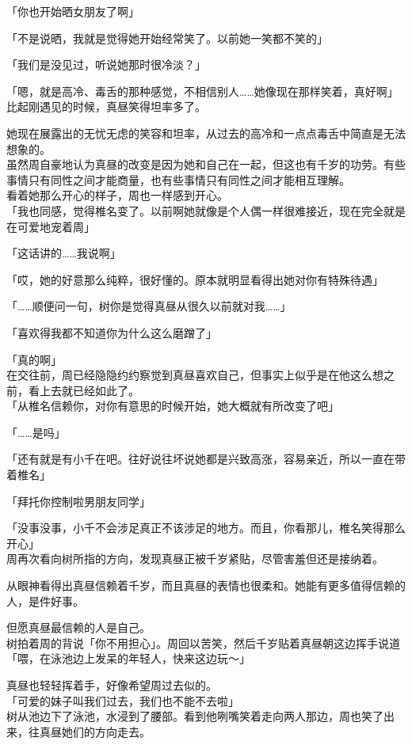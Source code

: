「你也开始晒女朋友了啊」

「不是说晒，我就是觉得她开始经常笑了。以前她一笑都不笑的」

「我们是没见过，听说她那时很冷淡？」

「嗯，就是高冷、毒舌的那种感觉，不相信别人……她像现在那样笑着，真好啊」\\

比起刚遇见的时候，真昼笑得坦率多了。

她现在展露出的无忧无虑的笑容和坦率，从过去的高冷和一点点毒舌中简直是无法想象的。\\

虽然周自豪地认为真昼的改变是因为她和自己在一起，但这也有千岁的功劳。有些事情只有同性之间才能商量，也有些事情只有同性之间才能相互理解。\\

看着她那么开心的样子，周也一样感到开心。\\

「我也同感，觉得椎名变了。以前啊她就像是个人偶一样很难接近，现在完全就是在可爱地宠着周」

「这话讲的……我说啊」

「哎，她的好意那么纯粹，很好懂的。原本就明显看得出她对你有特殊待遇」

「……顺便问一句，树你是觉得真昼从很久以前就对我……」

「喜欢得我都不知道你为什么这么磨蹭了」

「真的啊」\\

在交往前，周已经隐隐约约察觉到真昼喜欢自己，但事实上似乎是在他这么想之前，看上去就已经如此了。\\

「从椎名信赖你，对你有意思的时候开始，她大概就有所改变了吧」

「……是吗」

「还有就是有小千在吧。往好说往坏说她都是兴致高涨，容易亲近，所以一直在带着椎名」

「拜托你控制啦男朋友同学」

「没事没事，小千不会涉足真正不该涉足的地方。而且，你看那儿，椎名笑得那么开心」\\

周再次看向树所指的方向，发现真昼正被千岁紧贴，尽管害羞但还是接纳着。

从眼神看得出真昼信赖着千岁，而且真昼的表情也很柔和。她能有更多值得信赖的人，是件好事。

但愿真昼最信赖的人是自己。\\

树拍着周的背说「你不用担心」。周回以苦笑，然后千岁贴着真昼朝这边挥手说道「喂，在泳池边上发呆的年轻人，快来这边玩～」

真昼也轻轻挥着手，好像希望周过去似的。\\

「可爱的妹子叫我们过去，我们也不能不去啦」\\

树从池边下了泳池，水浸到了腰部。看到他咧嘴笑着走向两人那边，周也笑了出来，往真昼她们的方向走去。
